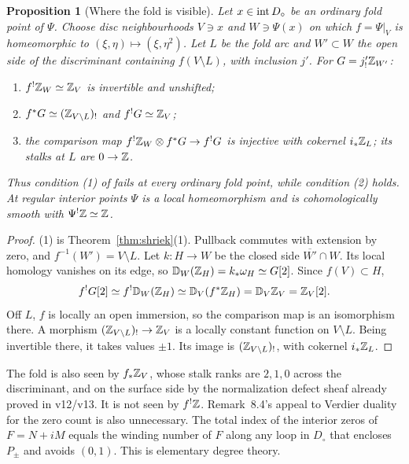 \documentclass[11pt]{article}
\newtheorem{proposition}[theorem]{Proposition}
\theoremstyle{definition}\newtheorem{definition}[theorem]{Definition}
\theoremstyle{remark}\newtheorem{remark}[theorem]{Remark}
\begin{document}
\begin{proposition}[Where the fold is visible]\label{prop:detect}
Let $x\in\operatorname{int} D_\circ$ be an ordinary fold point of $\Psi$. Choose disc
neighbourhoods $V\ni x$ and $W\ni\Psi(x)$ on which $f=\Psi|_V$ is
homeomorphic to $(\xi,\eta)\mapsto(\xi,\eta^2)$. Let $L$ be the fold arc and
$W'\subset W$ the open side of the discriminant containing $f(V\setminus L)$,
with inclusion $j'$. For $G=j'_!\mathbb Z_{W'}$:
\begin{enumerate}
\item $f^!\mathbb Z_W\simeq\mathbb Z_V$ is invertible and unshifted;
\item $f^*G\simeq(\mathbb Z_{V\setminus L})_!$ and $f^!G\simeq\mathbb Z_V$;
\item the comparison map $f^!\mathbb Z_W\otimes f^*G\to f^!G$ is injective with cokernel
$i_*\mathbb Z_L$; its stalks at $L$ are $0\to\mathbb Z$.
\end{enumerate}
Thus condition (1) of \cite[Def.~5.1]{scholze} fails at every ordinary fold
point, while condition (2) holds. At regular interior points $\Psi$ is a local
homeomorphism and is cohomologically smooth with $\Psi^!\mathbb Z\simeq\mathbb Z$.
\end{proposition}
\begin{proof}
(1) is Theorem~\ref{thm:shriek}(1). Pullback commutes with extension by zero,
and $f^{-1}(W')=V\setminus L$. Let $k:H\to W$ be the closed side
$\overline{W'}\cap W$. Its local homology vanishes on its edge, so
$\mathbb D_W(\mathbb Z_H)=k_*\omega_H\simeq G[2]$. Since $f(V)\subset H$,
\[
 f^!G[2]\simeq f^!\mathbb D_W(\mathbb Z_H)\simeq\mathbb D_V(f^*\mathbb Z_H)=\mathbb D_V\mathbb Z_V=\mathbb Z_V[2].
\]
Off $L$, $f$ is locally an open immersion, so the comparison map is an
isomorphism there. A morphism $(\mathbb Z_{V\setminus L})_!\to\mathbb Z_V$ is a locally
constant function on $V\setminus L$. Being invertible there, it takes values
$\pm1$. Its image is $(\mathbb Z_{V\setminus L})_!$, with cokernel $i_*\mathbb Z_L$.
\end{proof}

The fold is also seen by $f_*\mathbb Z_V$, whose stalk ranks are $2,1,0$ across the
discriminant, and on the surface side by the normalization defect sheaf already
proved in v12/v13. It is not seen by $f^!\mathbb Z$. Remark~8.4's appeal to Verdier
duality for the zero count is also unnecessary. The total index of the interior
zeros of $F=N+iM$ equals the winding number of $F$ along any loop in $D_\circ$
that encloses $P_\pm$ and avoids $(0,1)$. This is elementary degree theory.
\end{document}
